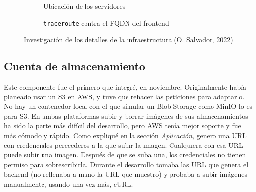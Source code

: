 \documentclass[11pt]{article}
\begin{document}
\begin{flushleft}
		\begin{figure}[htb]
			\begin{subfigure}{\textwidth}
				\centering
				\caption{Ubicación de los servidores}
			\end{subfigure}
			\linebreak
			
			\begin{subfigure}{\textwidth}
				\caption{\texttt{traceroute} contra el FQDN del frontend}
			\end{subfigure}

			
			\caption{Investigación de los detalles de la infraestructura (O. Salvador, 2022)}
		\end{figure}
	
	\bigskip
	\bigskip
	
	
	
	
	
	\subsection{Cuenta de almacenamiento}
	Este componente fue el primero que integré, en noviembre. Originalmente había planeado usar un S3 en AWS, y tuve que rehacer las peticiones para adaptarlo. No hay un contenedor local con el que simular un Blob Storage como MinIO lo es para S3. En ambas plataformas subir y borrar imágenes de sus almacenamientos ha sido la parte más difícil del desarrollo, pero AWS tenía mejor soporte y fue más cómodo y rápido. Como expliqué en la sección \textit{Aplicación}, genero una URL con credenciales perecederos a la que subir la imagen. Cualquiera con esa URL puede subir una imagen. Después de que se suba una, los credenciales no tienen permiso para sobrescribirla. Durante el desarrollo tomaba las URL que genera el backend (no rellenaba a mano la URL que muestro) y probaba a subir imágenes manualmente, usando una vez más, cURL. 
	\linebreak
	

\end{flushleft}
\end{document}
